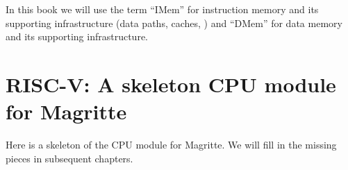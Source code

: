 
In this book we will use the term ``IMem'' for instruction memory and
its supporting infrastructure (data paths, caches, {\etc}) and
``DMem'' for data memory and its supporting infrastructure.


\section{RISC-V: A skeleton CPU module for Magritte}

\label{Sec_Magritte_Fetch_Decode_skeleton_CPU_module}


Here is a skeleton of the CPU module for Magritte.  We will fill in
the missing pieces in subsequent chapters.

